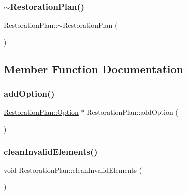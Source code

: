 \subsubsection{\texorpdfstring{$\sim$\+Restoration\+Plan()}{~RestorationPlan()}}
{\footnotesize\ttfamily Restoration\+Plan\+::$\sim$\+Restoration\+Plan (\begin{DoxyParamCaption}{ }\end{DoxyParamCaption})}



\subsection{Member Function Documentation}
\mbox{\label{class_restoration_plan_a4f3ae1b64679d1b191077043c5cdedb7}} 
\subsubsection{\texorpdfstring{add\+Option()}{addOption()}}
{\footnotesize\ttfamily \hyperlink{class_restoration_plan_1_1_option}{Restoration\+Plan\+::\+Option} $\ast$ Restoration\+Plan\+::add\+Option (\begin{DoxyParamCaption}{ }\end{DoxyParamCaption})}

\mbox{\label{class_restoration_plan_ab5733bd94e4808886168fe1688636499}} 
\subsubsection{\texorpdfstring{clean\+Invalid\+Elements()}{cleanInvalidElements()}}
{\footnotesize\ttfamily void Restoration\+Plan\+::clean\+Invalid\+Elements (\begin{DoxyParamCaption}{ }\end{DoxyParamCaption})}

\mbox{\label{class_restoration_plan_a719e93c4b00658a3932dd0abf2bdacf1}} 
